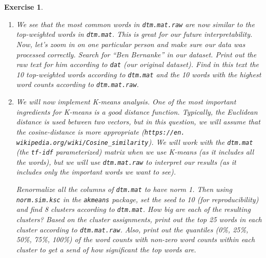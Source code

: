 \documentclass[12pt]{article}
\theoremstyle{colon}
\newtheorem{exercise}{Exercise}
\begin{document}
\begin{exercise}
\begin{enumerate}[label=\arabic*)]
      After running the script, how many words are left in our analysis? What are the top ten words in our remaining \texttt{dtm.mat.raw}?

    \item We see that the most common words in \texttt{dtm.mat.raw} are now similar to the top-weighted words in \texttt{dtm.mat}. This is great for our future interpretability. Now, let's zoom in on one particular person and make sure our data was processed correctly. Search for ``Ben Bernanke'' in our dataset. Print out the raw text for him according to \texttt{dat} (our original dataset). Find in this text the 10 top-weighted words according to \texttt{dtm.mat} and the 10 words with the highest word counts according to \texttt{dtm.mat.raw}.

    \item We will now implement K-means analysis. One of the most important ingredients for K-means is a good distance function. Typically, the Euclidean distance is used between two vectors, but in this question, we will assume that the cosine-distance is more appropriate (\texttt{https://en.{ }wikipedia.org/wiki/Cosine\_similarity}). We will work with the \texttt{dtm.mat} (the \texttt{tf-idf} parameterized) matrix when we use K-means (as it includes all the words), but we will use \texttt{dtm.mat.raw} to interpret our results (as it includes only the important words we want to see).

      Renormalize all the columns of \texttt{dtm.mat} to have norm 1. Then using \texttt{norm.sim.ksc} in the \texttt{akmeans} package, set the seed to 10 (for reproducibility) and find 8 clusters according to \texttt{dtm.mat}. How big are each of the resulting clusters? Based on the cluster assignments, print out the top 25 words in each cluster according to \texttt{dtm.mat.raw}. Also, print out the quantiles (0\%, 25\%, 50\%, 75\%, 100\%) of the word counts with non-zero word counts within each cluster to get a send of how significant the top words are.
  \end{enumerate}
\end{exercise}
\end{document}
